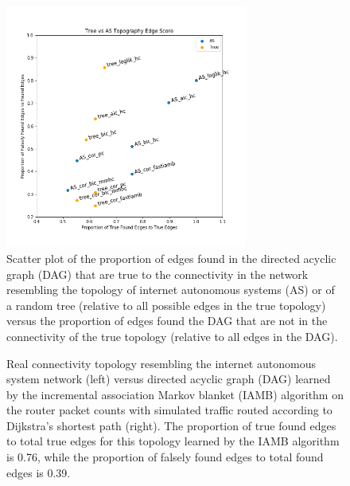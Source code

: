 \documentclass[conference]{IEEEtran}
\begin{document}
\begin{figure}[h!]
\centering
    \includegraphics[height=8cm]{images/edge_scores.png}
    \caption{Scatter plot of the proportion of edges found in the directed acyclic graph (DAG) that are true to the connectivity in the network resembling the topology of internet autonomous systems (AS) or of a random tree (relative to all possible edges in the true topology) versus the proportion of edges found the DAG that are not in the connectivity of the true topology (relative to all edges in the DAG).
}
\label{fig:edges}
\end{figure}
\begin{figure}%
    \centering
    \qquad
    \caption{Real connectivity topology resembling the internet autonomous system network (left) versus directed acyclic graph (DAG) learned by the incremental association Markov blanket (IAMB) algorithm on the router packet counts with simulated traffic routed according to Dijkstra's shortest path (right). The proportion of true found edges to total true edges for this topology learned by the IAMB algorithm is 0.76, while the proportion of falsely found edges to total found edges is 0.39.
}%
    \label{fig:AS}%
\end{figure}
\end{document}

